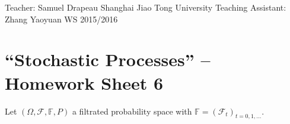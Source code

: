 \documentclass[DIV=classic,a4paper,10pt]{scrartcl}
\theoremstyle{nonumberplain}
\numberwithin{equation}{section}
\begin{document}
\noindent
Teacher: Samuel Drapeau \hfill Shanghai Jiao Tong University \newline
Teaching Assistant: Zhang Yaoyuan \hfill WS 2015/2016

\smallskip
\noindent
\hrulefill

\smallskip

\setcounter{section}{5}

\pagestyle{empty}


\section*{``Stochastic Processes'' -- Homework Sheet 6}
\thispagestyle{empty}




Let $(\Omega,\mathcal{F},\mathbb{F},P)$ a filtrated probability space with $\mathbb{F}=(\mathcal{F}_t)_{t=0,1,\ldots}$.
\end{document}
